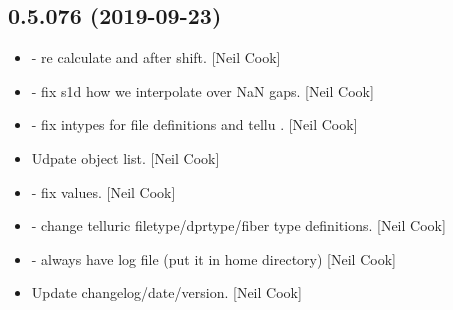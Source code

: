 \documentclass[a4paper,10pt,english]{report}
\begin{document}
\subsection{0.5.076 (2019-09-23)}
\label{\detokenize{misc/changelog:id67}}\begin{itemize}
\item {} 
 - re calculate  and 
after shift. {[}Neil Cook{]}

\item {} 
 - fix s1d how we interpolate over NaN gaps.
{[}Neil Cook{]}

\item {} 
 -
fix intypes for file definitions and tellu . {[}Neil Cook{]}

\item {} 
Udpate object list. {[}Neil Cook{]}

\item {} 
 - fix
 values. {[}Neil Cook{]}

\item {} 
 - change telluric
filetype/dprtype/fiber type definitions. {[}Neil Cook{]}

\item {} 
 - always have log file (put it in home directory)
{[}Neil Cook{]}

\item {} 
Update changelog/date/version. {[}Neil Cook{]}

\end{itemize}
\end{document}

